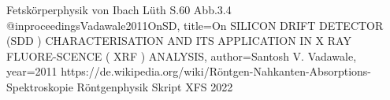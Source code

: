 \begin{thebibliography}{xx}
Fetskörperphysik von Ibach Lüth S.60 Abb.3.4
@inproceedingsVadawale2011OnSD, title=On SILICON DRIFT DETECTOR (SDD ) CHARACTERISATION AND ITS APPLICATION IN X  RAY FLUORE-SCENCE ( XRF ) ANALYSIS, author=Santosh V. Vadawale, year=2011
 https://de.wikipedia.org/wiki/Röntgen-Nahkanten-Absorptions-Spektroskopie
Röntgenphysik Skript XFS 2022


\end{thebibliography}